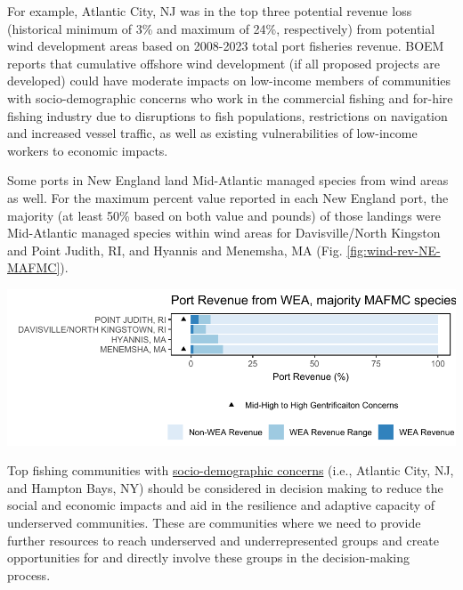 \documentclass[
  10pt,
]{article}
\let\origfigure\figure
\let\endorigfigure\endfigure
\renewenvironment{figure}[1][2] {
    \expandafter\origfigure\expandafter[H]
} {
    \endorigfigure
}
\begin{document}
For example, Atlantic City, NJ was in the top three potential revenue loss (historical minimum of 3\% and maximum of 24\%, respectively) from potential wind development areas based on 2008-2023 total port fisheries revenue. BOEM reports that cumulative offshore wind development (if all proposed projects are developed) could have moderate impacts on low-income members of communities with socio-demographic concerns who work in the commercial fishing and for-hire fishing industry due to disruptions to fish populations, restrictions on navigation and increased vessel traffic, as well as existing vulnerabilities of low-income workers to economic impacts.

Some ports in New England land Mid-Atlantic managed species from wind areas as well. For the maximum percent value reported in each New England port, the majority (at least 50\% based on both value and pounds) of those landings were Mid-Atlantic managed species within wind areas for Davisville/North Kingston and Point Judith, RI, and Hyannis and Menemsha, MA (Fig. \ref{fig:wind-rev-NE-MAFMC}).

\begin{figure}

\includegraphics{midatlantic_files/figure-latex/wind-rev-NE-MAFMC-1} \hfill{}

\caption{Percent of New England port revenue with majority MAFMC landings from Wind Energy Areas (WEA) in descending order from most to least port revenue from WEA.}\label{fig:wind-rev-NE-MAFMC}
\end{figure}

Top fishing communities with \href{https://noaa-edab.github.io/catalog/engagement.html}{socio-demographic concerns} (i.e., Atlantic City, NJ, and Hampton Bays, NY) should be considered in decision making to reduce the social and economic impacts and aid in the resilience and adaptive capacity of underserved communities. These are communities where we need to provide further resources to reach underserved and underrepresented groups and create opportunities for and directly involve these groups in the decision-making process.
\end{document}
